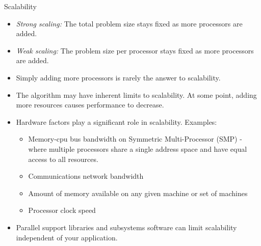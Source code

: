 \documentclass[10pt,times]{beamer}
\begin{document}
\begin{frame}{Scalability}
\begin{itemize}
\item \textit{Strong scaling:} The total problem size stays fixed as more processors 
are added. 
\item \textit{Weak scaling:} The problem size per processor stays fixed as more 
processors are added. 

\item Simply adding more processors is rarely the answer to scalability.

\item The algorithm may have inherent limits to scalability. At some point, adding 
more resources causes performance to decrease. 

\item Hardware factors play a significant role in scalability. Examples:

\begin{itemize}
\item Memory-cpu bus bandwidth on Symmetric Multi-Processor (SMP) -
    where multiple processors share a single 
    address space and have equal access to all resources. 
\item Communications network bandwidth
\item Amount of memory available on any given machine or set of machines
\item Processor clock speed 

\end{itemize}

\item Parallel support libraries and subsystems software can limit scalability 
independent of your application. 
\end{itemize}

\end{frame}
\end{document}
